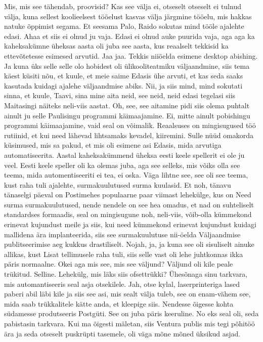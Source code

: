 Mis, mis see tähendab, proovisid?
Kas see välja ei, otseselt otseselt ei tulnud välja, kuna sellest koolieelsest tööelust kasvas välja järgmine tööelu, mis hakkas natuke õppimist segama. Et seesama Palo, Raido sokutas mind tööle ajalehte edasi.
Ahaa et siis ei olnud ju vaja.
Edasi ei olnud auke puurida vaja, aga aga ka kaheksakümne üheksas aasta oli juba see aasta, kus reaalselt tekkisid ka ettevõtetesse esimesed arvutid. Jaa jaa.
Tekkis niiöelda esimene desktop abishing. Ja kuna üks selle selle olo hobidest oli ülikooliteatmiku väljaandmine, siis tema käest küsiti nõu, et kuule, et meie saime Edasis ühe arvuti, et kas seda saaks kasutada kuidagi ajalehe väljaandmise abiks. Nii, ja siis mind, mind sokutati sinna, et kuule, Taavi, sina mine aita neid, see neid, neid edasi tegelasi siis Maitasingi näiteks neli-viis aastat.
Oh, see, see aitamine pidi siis olema puhtalt ainult ju selle Paulisingu programmi käimaajamine.
Ei, mitte ainult pobishingu programmi käimaajamine, vaid seal on võimalik. Reaalsuses on mingisugused töö rutiinid, et kui need lähevad lihtsamaks kevadel, kiiremini. Sulle nüüd omakorda küsimused, mis sa pakud, et mis oli esimene asi Edasis, mida arvutiga automatiseerita.
Aastal kaheksakümmend üheksa eesti keele spellerit ei ole ju veel.
Eesti keele speller oli ka olemas juba, aga see selleks, mis võiks olla see teema, mida automentiseeriti ei tea, ei oska. Väga lihtne see, see oli see teema, kust raha tuli ajalehte, surmakuulutused surma kuulasid. Et noh, tänavu tänaselgi päeval on Postimehes populaarne paar viimast lehekülge, kus on Need surma surmakuulutused, nende nendele on see hea omadus, et nad on suhteliselt standardses formaadis, seal on mingisugune noh, neli-viis, võib-olla kümmekond erinevat kujundust meile ja siis, kui need kümmekond erinevat kujundust kuidagi mallidena ära implanteerida, siis see surmakuulutuse nii-öelda Väljaandmise publitseerimise aeg kukkus drastiliselt. Nojah, ja, ja kuna see oli sisuliselt ainuke allikas, kust Lisat tellimusele raha tuli, siis selle vast oli lehe juhtkonnas ikka päris normaalne.
Okei aga mis see, mis see väljund?
Väljund oli kile peale trükitud. Selline.
Lehekülg, mis läks siis ofsettrükki?
Ühesõnaga sinu tarkvara, mis automantiseeris seal asja otsekilele.
Jah, otse kylal, laserprinteriga lased paberi abil läbi kile ja siis see asi, mis sealt välja tuleb, see on enam-vähem see, mida saab trükkalitele kätte anda, et kleepige siis.
Nendesse õigesse kohta südamesse produtseeris Postgüti.
See on juba päris keeruline.
No eks seal oli, seda pabistasin tarkvara. Kui ma õigesti mäletan, siis Ventura publis mis tegi põhitöö ära ja seda otseselt puskrüpti tasemele, oli väga mõne mõned üksikud asjad.
